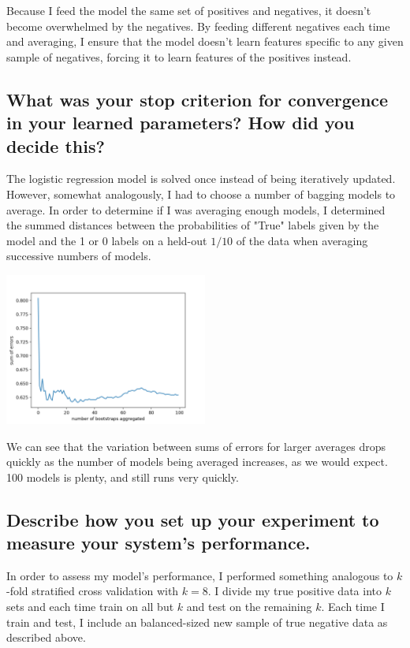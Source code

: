 \documentclass[]{article}
\begin{document}
Because I feed the model the same set of positives and negatives, it doesn't become overwhelmed by the negatives. By feeding different negatives each time and averaging, I ensure that the model doesn't learn features specific to any given sample of negatives, forcing it to 
learn features of the positives instead.

\subsection{What was your stop criterion for convergence in your learned parameters? How did you decide this?}

The logistic regression model is solved once instead of being iteratively updated. However, somewhat analogously, I had to choose a number of bagging models to average. In order to determine if I was averaging enough models, I determined the summed distances between the probabilities of "True" labels given by the model and the 1 or 0 labels on a held-out $1/10$ of the data when averaging successive numbers of models. 

\vspace{1em}
\includegraphics[width=0.5\textwidth]{numBaggingIterations.png}
\vspace{1em}

We can see that the variation between sums of errors for larger averages drops quickly as the number of models being averaged increases, as we would expect. 100 models is plenty, and still runs very quickly.

\subsection{Describe how you set up your experiment to measure your system's performance.}

In order to assess my model's performance, I performed something analogous to $k$-fold stratified cross validation with $k=8$. I divide my true positive data into $k$ sets and each time train on all but $k$ and test on the remaining $k$. Each time I train and test, I include an balanced-sized new sample of true negative data as described above.
\end{document}
